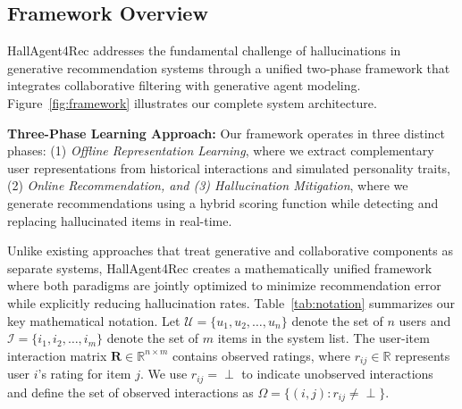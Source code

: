 \documentclass[acmsmall]{acmart}
\begin{document}
\subsection{Framework Overview}
\label{sec:framework_overview}

HallAgent4Rec addresses the fundamental challenge of hallucinations in generative recommendation systems through a unified two-phase framework that integrates collaborative filtering with generative agent modeling. Figure~\ref{fig:framework} illustrates our complete system architecture.

\textbf{Three-Phase Learning Approach:} Our framework operates in three distinct phases: (1) \textit{Offline Representation Learning}, where we extract complementary user representations from historical interactions and simulated personality traits, (2) \textit{Online Recommendation, and (3) Hallucination Mitigation}, where we generate recommendations using a hybrid scoring function while detecting and replacing hallucinated items in real-time.

Unlike existing approaches that treat generative and collaborative components as separate systems, HallAgent4Rec creates a mathematically unified framework where both paradigms are jointly optimized to minimize recommendation error while explicitly reducing hallucination rates.
Table~\ref{tab:notation} summarizes our key mathematical notation. Let $\mathcal{U} = \{u_1, u_2, \ldots, u_n\}$ denote the set of $n$ users and $\mathcal{I} = \{i_1, i_2, \ldots, i_m\}$ denote the set of $m$ items in the system list. The user-item interaction matrix $\mathbf{R} \in \mathbb{R}^{n \times m}$ contains observed ratings, where $r_{ij} \in \mathbb{R}$ represents user $i$'s rating for item $j$. We use $r_{ij} = \perp$ to indicate unobserved interactions and define the set of observed interactions as $\Omega = \{(i,j) : r_{ij} \neq \perp\}$.
\end{document}

